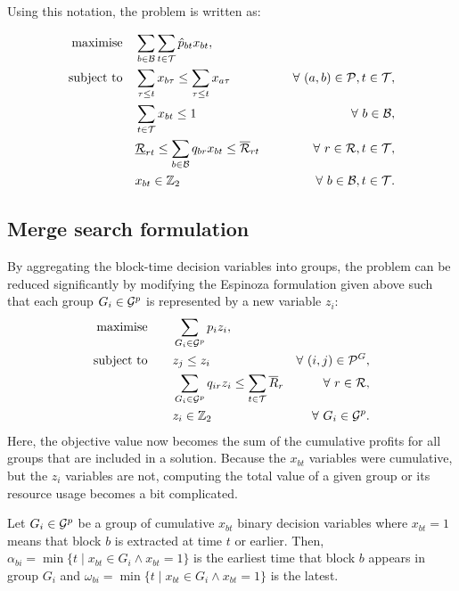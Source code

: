 \documentclass[journal]{IEEEtran}
\begin{document}
Using this notation, the problem is written as:

{\footnotesize
\begin{align}
\Max \quad & \displaystyle\sum_{b \in \S{B}}\displaystyle\sum_{t \in \S{T}} \hat{p}_{bt}x_{bt},\label{eq:cpit_form}\\
\ST \quad & \displaystyle\sum_{\tau \leq t}x_{b\tau} \leq \displaystyle\sum_{\tau \leq t}x_{a\tau} \qquad \qquad & \forall\ (a,b) \in \mathcal{P}, t \in \S{T},\nonumber\\
& \displaystyle\sum_{t \in \S{T}}x_{bt} \leq 1 & \forall\ b \in \S{B},\nonumber\\
& \underline{\S{R}}_{rt} \leq \displaystyle\sum_{b \in \S{B}}q_{br}x_{bt} \leq \overline{\S{R}}_{rt} & \forall\ r \in \S{R}, t \in \S{T},\nonumber\\
& x_{bt} \in \Bin & \forall\ b \in \S{B}, t \in \S{T}\nonumber.
\end{align}
}

\subsection*{Merge search formulation}

By aggregating the block-time decision variables into groups, the problem can be reduced significantly by modifying the Espinoza formulation given above such that each group $G_i \in \S{G}^p$ is represented by a new variable $z_i$: 
{\footnotesize
\begin{align}
\Max \qquad & \displaystyle\sum_{G_i \in \S{G}^p} p_{i}z_i,\label{eq:cpit_merge}\\
\ST \qquad & z_j \leq z_i \qquad \qquad & \forall\ (i,j) \in \mathcal{P}^G, \nonumber\\
& \displaystyle\sum_{G_i \in \S{G}^p}q_{ir}z_i \leq \displaystyle\sum_{t \in \S{T}}\overline{R}_{r} & \forall\ r \in \S{R}, \nonumber\\
& z_i \in \Bin & \forall\ G_i \in \S{G}^p \nonumber.
\end{align}
}
Here, the objective value now becomes the sum of the cumulative profits for all groups that are included in a solution. Because the $x_{bt}$ variables were cumulative, but the $z_i$ variables are not, computing the total value of a given group or its resource usage becomes a bit complicated.

\begin{definition}
Let $G_i \in \S{G}^p$ be a group of cumulative \(x_{bt}\) binary decision variables where \(x_{bt} = 1\) means that block $b$ is extracted at time $t$ or earlier. Then, \(\alpha_{bi} = \min\{t \mid x_{bt} \in G_i \land x_{bt} = 1\}\) is the earliest time that block \(b\) appears in group \(G_i\) and \(\omega_{bi} = \min\{t \mid x_{bt} \in G_i \land x_{bt} = 1\}\) is the latest.
\end{definition}
\end{document}
